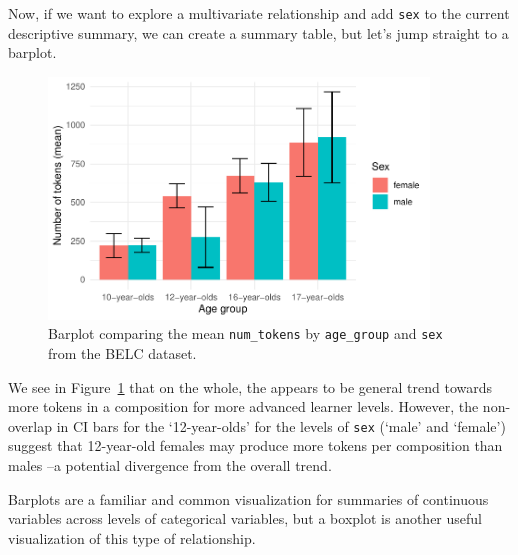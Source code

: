 \documentclass[
  letterpaper,
]{latex/krantz}
\begin{document}
Now, if we want to explore a multivariate relationship and add
\texttt{sex} to the current descriptive summary, we can create a summary
table, but let's jump straight to a barplot.

\begin{figure}[h]

{\centering \includegraphics[width=0.9\textwidth,height=\textheight]{./approaching-analysis_files/figure-pdf/fig-summaries-multivariate-barplot-belc-1.pdf}

}

\caption{\label{fig-summaries-multivariate-barplot-belc}Barplot
comparing the mean \texttt{num\_tokens} by \texttt{age\_group} and
\texttt{sex} from the BELC dataset.}

\end{figure}

We see in Figure~\ref{fig-summaries-multivariate-barplot-belc} that on
the whole, the appears to be general trend towards more tokens in a
composition for more advanced learner levels. However, the non-overlap
in CI bars for the `12-year-olds' for the levels of \texttt{sex} (`male'
and `female') suggest that 12-year-old females may produce more tokens
per composition than males --a potential divergence from the overall
trend.

Barplots are a familiar and common visualization for summaries of
continuous variables across levels of categorical variables, but a
boxplot is another useful visualization of this type of relationship.
\end{document}
